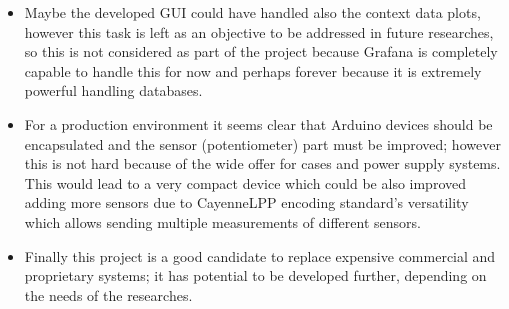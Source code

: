 \documentclass[11pt,a4paper,dvipsnames,twoside]{article}
\begin{document}
\begin{itemize}
    \item Maybe the developed GUI could have handled also the context data plots, however this task is left as an objective to be addressed in future researches, so this is not considered as part of the project because Grafana is completely capable to handle this for now and perhaps forever because it is extremely powerful handling databases.
    \item For a production environment it seems clear that Arduino devices should be encapsulated and the sensor (potentiometer) part must be improved; however this is not hard because of the wide offer for cases and power supply systems. This would lead to a very compact device which could be also improved adding more sensors due to CayenneLPP encoding standard's versatility which allows sending multiple measurements of different sensors. 
    \item Finally this project is a good candidate to replace expensive commercial and proprietary systems; it has potential to be developed further, depending on the needs of the researches.
\end{itemize}

\clearpage{\pagestyle{empty}\cleardoublepage}\pagestyle{myfancy} %
\printbibliography
\end{document}
